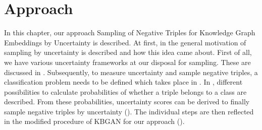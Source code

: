 \chapter{Approach}
\label{ch:approach}
%
In this chapter, our approach Sampling of Negative Triples for Knowledge Graph Embeddings by Uncertainty is described.
At first, in  the general motivation of sampling by uncertainty is described and how this idea came about.
First of all, we have various uncertainty frameworks at our disposal for sampling.
These are discussed in .
Subsequently, to measure uncertainty and sample negative triples, a classification problem needs to be defined which takes place in .
In , different possibilities to calculate probabilities of whether a triple belongs to a class are described.
From these probabilities, uncertainty scores can be derived to finally sample negative triples by uncertainty ().
The individual steps are then reflected in the modified procedure of \textsc{KBGAN} for our approach ().







%